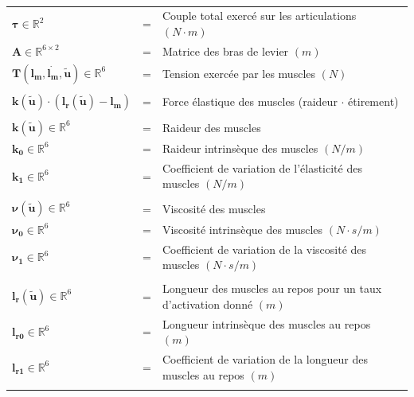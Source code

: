 \documentclass[pdftex,a4paper,11pt]{report}
\newcommand{\vs}[1]{\boldsymbol{#1}} %
\newcommand{\ms}[1]{\boldsymbol{#1}} %
\numberwithin{equation}{subsection}
\begin{document}
\paragraph{}
\begin{small}
\begin{tabular}{lcl}
    $\vs{\tau} \in \mathbb{R}^2$              & = & Couple total exercé sur les articulations $(N \cdot m)$ \\
    $\ms{A} \in \mathbb{R}^{6 \times 2}$      & = & Matrice des bras de levier $(m)$ \\
    $\vs{T}(\vs{l_m}, \vs{\dot{l_m}}, \vs{\tilde{u}}) \in \mathbb{R}^6$  & = & Tension exercée par les muscles $(N)$ \\
    \\
    $\vs{k}(\vs{\tilde{u}}) \cdot (\vs{l_r}(\vs{\tilde{u}}) - \vs{l_m})$ & = & Force élastique des muscles (raideur $\cdot$ étirement) \\
    \\

    $\vs{k}(\vs{\tilde{u}}) \in \mathbb{R}^6$      & = & Raideur des muscles \\
    $\vs{k_0} \in \mathbb{R}^6$               & = & Raideur intrinsèque des muscles $(N/m)$ \\
    $\vs{k_1} \in \mathbb{R}^6$               & = & Coefficient de variation de l'élasticité des muscles $(N/m)$ \\
    \\

    $\vs{\nu}(\vs{\tilde{u}}) \in \mathbb{R}^6$    & = & Viscosité des muscles \\
    $\vs{\nu_0} \in \mathbb{R}^6$             & = & Viscosité intrinsèque des muscles $(N \cdot s/m)$ \\
    $\vs{\nu_1} \in \mathbb{R}^6$             & = & Coefficient de variation de la viscosité des muscles $(N \cdot s/m)$ \\
    \\

    $\vs{l_r}(\vs{\tilde{u}}) \in \mathbb{R}^6$    & = & Longueur des muscles au repos pour un taux d'activation donné $(m)$ \\
    $\vs{l_{r0}} \in \mathbb{R}^6$            & = & Longueur intrinsèque des muscles au repos $(m)$ \\
    $\vs{l_{r1}} \in \mathbb{R}^6$            & = & Coefficient de variation de la longueur des muscles au repos $(m)$ \\
    \\


\end{tabular}
\end{small}
\end{document}
